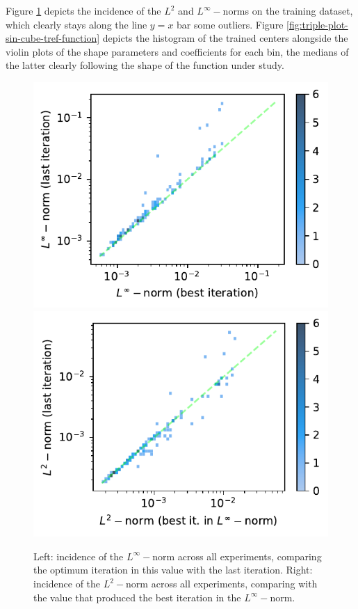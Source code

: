 \documentclass[12pt]{report} %
\begin{document}
Figure \ref{fig:incidence-l-sin-cube-tref-function} depicts the incidence of the $L^2$ and $L^\infty-$norms on the training dataset, which clearly stays along the line $y=x$ bar some outliers. Figure \ref{fig:triple-plot-sin-cube-tref-function} depicts the histogram of the trained centers alongside the violin plots of the shape parameters and coefficients for each bin, the medians of the latter clearly following the shape of the function under study.

\begin{figure}
  \includegraphics[width=.45\textwidth]{imagenes/experiments/1d/statistical_1d_full_scheduler_interpolation/sin_cube_tref/incidence_of_linf_sin_cube_tref.pdf}
  \includegraphics[width=.45\textwidth]{imagenes/experiments/1d/statistical_1d_full_scheduler_interpolation/sin_cube_tref/incidence_of_l2_sin_cube_tref.pdf}
  \caption{Left: incidence of the $L^\infty-$norm across all experiments, comparing the optimum iteration in this value with the last iteration. Right: incidence of the $L^2-$norm across all experiments, comparing with the value that produced the best iteration in the $L^\infty-$norm.}
  \label{fig:incidence-l-sin-cube-tref-function}
\end{figure}
\end{document}
